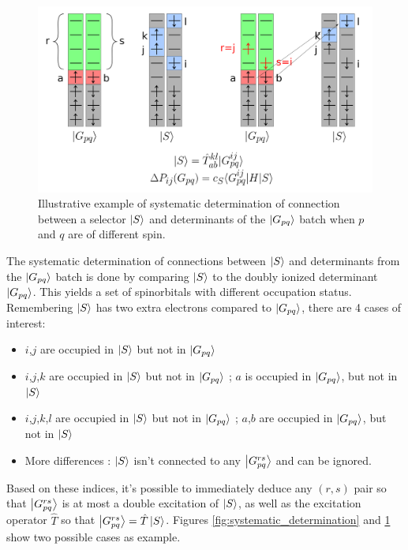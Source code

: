\documentclass[./thesis.tex]{subfiles}
\begin{document}
\begin{figure}[h!]
        \begin{center}
                \includegraphics[width=0.90\columnwidth]{figures/cipsi/systematic_determination2}       
        \end{center}
        \caption{Illustrative example of systematic determination of connection between a selector $\ket S$ and determinants of the $\ket {G_{pq}}$ batch when $p$ and $q$ are of different spin.}
        \label{fig:systematic_determination2}
\end{figure}


The systematic determination of connections between $\ket S$ and determinants from the $\ket {G_{pq}}$ batch is done by comparing $\ket S$ to the doubly ionized determinant $\ket {G_{pq}}$. This yields a set of spinorbitals with different occupation status. Remembering $\ket S$ has two extra electrons compared to $\ket {G_{pq}}$, there are 4 cases of interest:
\begin{itemize}

\item
$i$,$j$ are occupied in $\ket S$ but not in $\ket {G_{pq}}$
\item
$i$,$j$,$k$ are occupied in $\ket S$ but not in $\ket {G_{pq}}$ ; $a$ is occupied in $\ket {G_{pq}}$, but not in $\ket S$
\item
$i$,$j$,$k$,$l$ are occupied in $\ket S$ but not in $\ket {G_{pq}}$ ; $a$,$b$ are occupied in $\ket {G_{pq}}$, but not in $\ket S$
\item
More differences : $\ket S$ isn't connected to any $\ket {G_{pq}^{rs}}$ and can be ignored. 

\end{itemize}

Based on these indices, it's possible to immediately deduce any $(r,s)$ pair so that $\ket {G_{pq}^{rs}}$ is at most a double excitation of $\ket S$, as well as the excitation operator $\hat{T}$ so that $\ket {G_{pq}^{rs}}=\hat{T} \ket S$. Figures \ref{fig:systematic_determination} and \ref{fig:systematic_determination2} show two possible cases as example.
\end{document}
